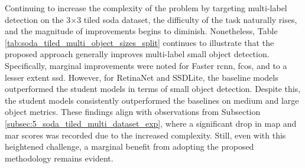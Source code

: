 Continuing to increase the complexity of the problem by targeting multi-label detection on the 3$\times$3 tiled \gls{soda} dataset, the difficulty of the task naturally rises, and the magnitude of improvements begins to diminish. Nonetheless, Table \ref{tab:soda_tiled_multi_object_sizes_split} continues to illustrate that the proposed approach generally improves multi-label small object detection. Specifically, marginal improvements were noted for Faster \gls{rcnn}, \gls{fcos}, and to a lesser extent \gls{ssd}. However, for RetinaNet and SSDLite, the baseline models outperformed the student models in terms of small object detection. Despite this, the student models consistently outperformed the baselines on medium and large object metrics. These findings align with observations from Subsection \ref{subsec:5_soda_tiled_multi_dataset_exp}, where a significant drop in \gls{map} and \gls{mar} scores was recorded due to the increased complexity. Still, even with this heightened challenge, a marginal benefit from adopting the proposed methodology remains evident.

